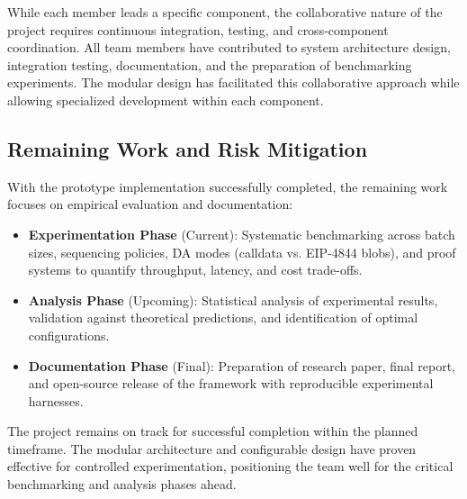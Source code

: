 \vspace{12pt}
While each member leads a specific component, the collaborative nature of the project requires continuous integration, testing, and cross-component coordination. All team members have contributed to system architecture design, integration testing, documentation, and the preparation of benchmarking experiments. The modular design has facilitated this collaborative approach while allowing specialized development within each component.

\vspace{12pt}
\subsection{Remaining Work and Risk Mitigation}
\vspace{12pt}
With the prototype implementation successfully completed, the remaining work focuses on empirical evaluation and documentation:

\begin{itemize}
    \item \textbf{Experimentation Phase} (Current): Systematic benchmarking across batch sizes, sequencing policies, DA modes (calldata vs. EIP-4844 blobs), and proof systems to quantify throughput, latency, and cost trade-offs.
    \item \textbf{Analysis Phase} (Upcoming): Statistical analysis of experimental results, validation against theoretical predictions, and identification of optimal configurations.
    \item \textbf{Documentation Phase} (Final): Preparation of research paper, final report, and open-source release of the framework with reproducible experimental harnesses.
\end{itemize}

The project remains on track for successful completion within the planned timeframe. The modular architecture and configurable design have proven effective for controlled experimentation, positioning the team well for the critical benchmarking and analysis phases ahead.

\clearpage
